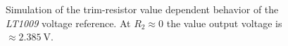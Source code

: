     \newpage
    \begin{figure}[h]
        \centering
        
        \caption[Simulation of the trim-resistor value dependent behavior of the \textit{LT1009} voltage reference]{Simulation of the trim-resistor value dependent behavior of the \textit{LT1009} voltage reference. At \(R_2 \approx 0\) the value output voltage is \(\approx \qty{2.385}{\volt}\).}%
        \label{fig:LT1009 sim}
    \end{figure}
    \newpage
    \begin{figure}
        \centering
        \begin{subfigure}{.3\textwidth}

\end{subfigure}
\end{figure}
